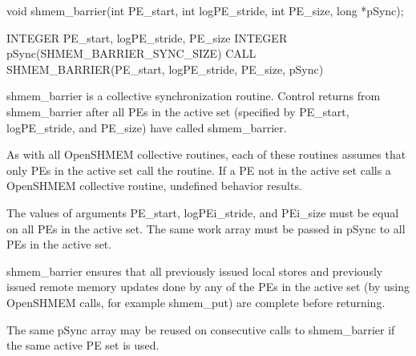 
\synC
	  void shmem_barrier(int \ac{PE}_start, int log\ac{PE}_stride, int \ac{PE}_size, long *pSync);

\synF
	  INTEGER \ac{PE}_start, log\ac{PE}_stride, \ac{PE}_size
	  INTEGER pSync(SHMEM_BARRIER_SYNC_SIZE)
	  CALL SHMEM_BARRIER(\ac{PE}_start, log\ac{PE}_stride, \ac{PE}_size, pSync)


{
       shmem\_barrier is a collective synchronization routine.  Control returns
       from shmem\_barrier after all  \ac{PE}s  in  the  active  set	(specified  by
       \ac{PE}\_start, log\ac{PE}\_stride, and \ac{PE}\_size) have called shmem\_barrier.

       As  with	 all OpenSHMEM collective routines, each of these routines assumes
       that only \ac{PE}s in the active set call the routine.  If a \ac{PE} not  in  the
       active  set  calls  a  OpenSHMEM  collective	 routine,  undefined  behavior
       results.

       The  values  of	arguments  \ac{PE}\_start, log\ac{PE}i\_stride, and \ac{PE}i\_size must be
       equal on all \ac{PE}s in the active set.  The same work array must be passed
       in pSync to all \ac{PE}s in the active set.

       shmem\_barrier  ensures  that  all  previously  issued  local stores and
       previously issued remote memory updates done by any of the \ac{PE}s  in  the
       active  set  (by	 using	OpenSHMEM  calls,  for  example  shmem\_put) are
       complete before returning.

       The  same  pSync	 array	may  be	 reused	 on   consecutive   calls   to
       shmem\_barrier if the same active \ac{PE} set is used.
}

